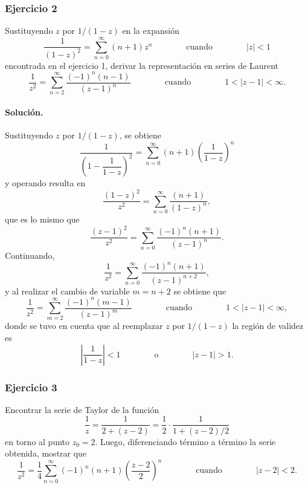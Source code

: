\documentclass[a4paper]{report}
\begin{document}
\subsubsection*{Ejercicio 2}

Sustituyendo \(z\) por \(1/(1-z)\) en la expansión
\[
 \frac{1}{(1-z)^2}=\sum_{n=0}^\infty(n+1)z^n
 \qquad\qquad\textrm{cuando}\qquad\qquad
 |z|<1
\]
encontrada en el ejercicio 1, derivar la representación en series de Laurent
\[
 \frac{1}{z^2}=\sum_{n=2}^\infty\frac{(-1)^n(n-1)}{(z-1)^n}
 \qquad\qquad\textrm{cuando}\qquad\qquad
 1<|z-1|<\infty.
\]

\paragraph{Solución.} Sustituyendo \(z\) por \(1/(1-z)\), se obtiene
\[
 \dfrac{1}{\left(1-\dfrac{1}{1-z}\right)^2}=\sum_{n=0}^\infty(n+1)\left(\frac{1}{1-z}\right)^n
\]
y operando resulta en
\[
 \frac{(1-z)^2}{z^2}=\sum_{n=0}^\infty\frac{(n+1)}{(1-z)^n},
\]
que es lo mismo que
\[
 \frac{(z-1)^2}{z^2}=\sum_{n=0}^\infty\frac{(-1)^n(n+1)}{(z-1)^n}.
\]
Continuando,
\[
 \frac{1}{z^2}=\sum_{n=0}^\infty\frac{(-1)^n(n+1)}{(z-1)^{n+2}},
\]
y al realizar el cambio de variable \(m=n+2\) se obtiene que 
\[
 \frac{1}{z^2}=\sum_{m=2}^\infty\frac{(-1)^n(m-1)}{(z-1)^m}\qquad\qquad\textrm{cuando}\qquad\qquad
 1<|z-1|<\infty,
\]
donde se tuvo en cuenta que al reemplazar \(z\) por \(1/(1-z)\) la región de validez es
\[
 \left|\frac{1}{1-z}\right|<1
 \qquad\qquad\textrm{o}\qquad\qquad
 |z-1|>1.
\]

\subsubsection*{Ejercicio 3}

Encontrar la serie de Taylor de la función
\[
 \frac{1}{z}=\frac{1}{2+(z-2)}=\frac{1}{2}\cdot\frac{1}{1+(z-2)/2}
\]
en torno al punto \(z_0=2\). Luego, diferenciando término a término la serie obtenida, mostrar que 
\[
 \frac{1}{z^2}=\frac{1}{4}\sum_{n=0}^\infty(-1)^n(n+1)\left(\frac{z-2}{2}\right)^n
 \qquad\qquad\textrm{cuando}\qquad\qquad
 |z-2|<2.
\]
\end{document}
